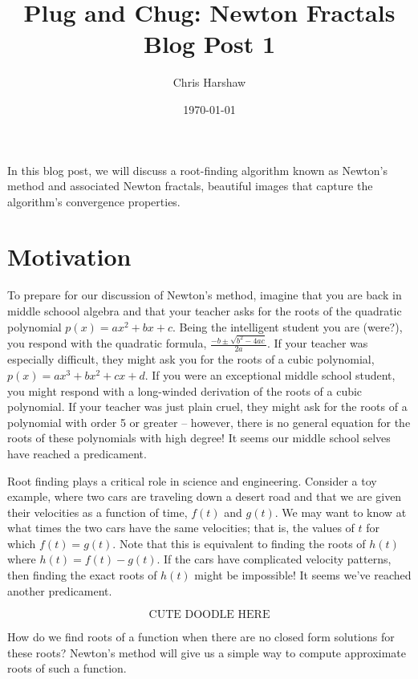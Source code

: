 \documentclass{book}
\begin{document}
\title{Plug and Chug: Newton Fractals  \\ Blog Post 1}
\author{Chris Harshaw}
\date{\today}
\maketitle

In this blog post, we will discuss a root-finding algorithm known as Newton's method and associated Newton fractals, beautiful images that capture the algorithm's convergence properties.

\section{Motivation}
 To prepare for our discussion of Newton's method, imagine that you are back in middle schoool algebra and that your teacher asks for the roots of the quadratic polynomial $p(x) = ax^2 + bx + c$. Being the intelligent student you are (were?), you respond with the quadratic formula, $\frac{-b \pm \sqrt{b^2 - 4ac}}{2a}$. If your teacher was especially difficult, they might ask you for the roots of a cubic polynomial, $p(x) = a x^3 + b x^2 + c x + d$. If you were an exceptional middle school student, you might respond with a long-winded derivation of the roots of a cubic polynomial. If your teacher was just plain cruel, they might ask for the roots of a polynomial with order 5 or greater -- however, there is no general equation for the roots of these polynomials with high degree! It seems our middle school selves have reached a predicament.

Root finding plays a critical role in science and engineering. Consider a toy example, where two cars are traveling down a desert road and that we are given their velocities as a function of time, $f(t)$ and $g(t)$. We may want to know at what times the two cars have the same velocities; that is, the values of $t$ for which $f(t) = g(t)$. Note that this is equivalent to finding the roots of $h(t)$ where $h(t)=f(t)-g(t)$. If the cars have complicated velocity patterns, then finding the exact roots of $h(t)$ might be impossible! It seems we've reached another predicament.

$$ \text{CUTE DOODLE HERE} $$

How do we find roots of a function when there are no closed form solutions for these roots? Newton's method will give us a simple way to compute approximate roots of such a function.
\end{document}
